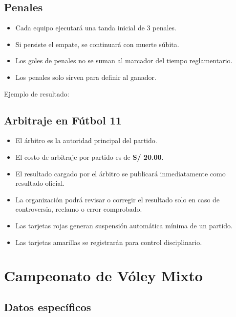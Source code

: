 \documentclass[12pt,a4paper]{article}
\begin{document}
\subsection{Penales}

\begin{itemize}
  \item Cada equipo ejecutará una tanda inicial de 3 penales.
  \item Si persiste el empate, se continuará con muerte súbita.
  \item Los goles de penales no se suman al marcador del tiempo reglamentario.
  \item Los penales solo sirven para definir al ganador.
\end{itemize}

Ejemplo de resultado:

\begin{center}
\end{center}

\subsection{Arbitraje en Fútbol 11}

\begin{itemize}
  \item El árbitro es la autoridad principal del partido.
  \item El costo de arbitraje por partido es de \textbf{S/ 20.00}.
  \item El resultado cargado por el árbitro se publicará inmediatamente como resultado oficial.
  \item La organización podrá revisar o corregir el resultado solo en caso de controversia, reclamo o error comprobado.
  \item Las tarjetas rojas generan suspensión automática mínima de un partido.
  \item Las tarjetas amarillas se registrarán para control disciplinario.
\end{itemize}

\section{Campeonato de Vóley Mixto}

\subsection{Datos específicos}
\end{document}
